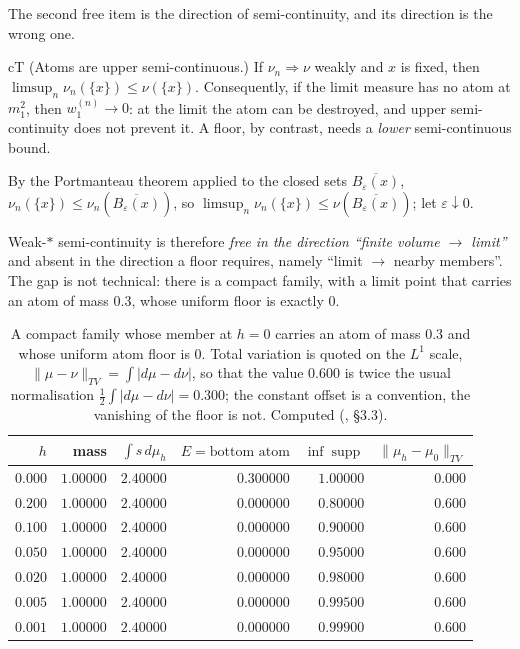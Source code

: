 The second free item is the direction of semi-continuity, and its direction is the wrong one.

\begin{claimbox}{cT}
 (Atoms are upper semi-continuous.) If $\nu_n\Rightarrow\nu$ weakly and
$x$ is fixed, then $\limsup_n \nu_n(\{x\})\le\nu(\{x\})$. Consequently, if the limit measure has no
atom at $m_1^2$, then $w_1^{(n)}\to0$: at the limit the atom can be destroyed, and upper
semi-continuity does not prevent it. A floor, by contrast, needs a \emph{lower}
semi-continuous bound.
\end{claimbox}
\begin{proofx}
By the Portmanteau theorem applied to the closed sets $\overline{B_\varepsilon(x)}$,
$\nu_n(\{x\})\le\nu_n(\overline{B_\varepsilon(x)})$, so
$\limsup_n\nu_n(\{x\})\le\nu(\overline{B_\varepsilon(x)})$; let $\varepsilon\downarrow0$.
\end{proofx}

Weak-$*$ semi-continuity is therefore \emph{free in the direction ``finite volume $\to$ limit''} and
absent in the direction a floor requires, namely ``limit $\to$ nearby members''. The gap is not
technical: there is a compact family, with a limit point that carries an atom of mass $0.3$, whose
uniform floor is exactly $0$.

\begin{table}[htbp]
\centering\small
\begin{tabular}{@{}rrrrrr@{}}
\toprule
$h$ & mass & $\int s\,d\mu_h$ & $E=\text{bottom atom}$ & $\inf\operatorname{supp}$ & $\|\mu_h-\mu_0\|_{TV}$ \\
\midrule
$0.000$ & $1.00000$ & $2.40000$ & $0.300000$ & $1.00000$ & $0.000$ \\
$0.200$ & $1.00000$ & $2.40000$ & $0.000000$ & $0.80000$ & $0.600$ \\
$0.100$ & $1.00000$ & $2.40000$ & $0.000000$ & $0.90000$ & $0.600$ \\
$0.050$ & $1.00000$ & $2.40000$ & $0.000000$ & $0.95000$ & $0.600$ \\
$0.020$ & $1.00000$ & $2.40000$ & $0.000000$ & $0.98000$ & $0.600$ \\
$0.005$ & $1.00000$ & $2.40000$ & $0.000000$ & $0.99500$ & $0.600$ \\
$0.001$ & $1.00000$ & $2.40000$ & $0.000000$ & $0.99900$ & $0.600$ \\
\bottomrule
\end{tabular}
\caption{A compact family whose member at $h=0$ carries an atom of mass $0.3$ and whose uniform atom
floor is $0$. Total variation is quoted on the $L^1$ scale,
$\|\mu-\nu\|_{TV}=\int|d\mu-d\nu|$, so that the value $0.600$ is twice the usual normalisation
$\frac12\int|d\mu-d\nu|=0.300$; the constant offset is a convention, the vanishing of the floor is
not. Computed (, \S3.3).}
\label{tab:compact}
\end{table}

